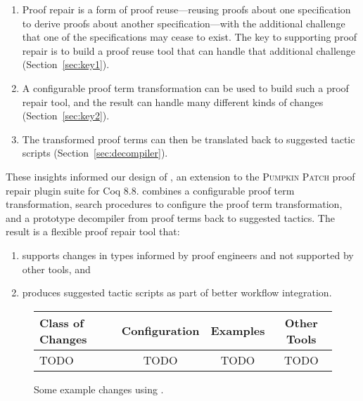 \begin{enumerate}
\item Proof repair is a form of proof reuse---reusing proofs about one specification to derive proofs about another specification---with 
the additional challenge that one of the specifications may cease to exist.
The key to supporting proof repair is to build a proof reuse
tool that can handle that additional challenge (Section~\ref{sec:key1}). 
\item A configurable proof term transformation can be used to build such a proof repair tool,
and the result can handle many different kinds of changes (Section~\ref{sec:key2}).
\item The transformed proof terms can then be translated back to suggested tactic scripts (Section~\ref{sec:decompiler}).
\end{enumerate}

These insights informed our design of \toolname, an extension to the \textsc{Pumpkin Patch} proof repair plugin suite for Coq 8.8.
\toolname combines a configurable proof term transformation,
search procedures to configure the proof term transformation,
and a prototype decompiler from proof terms back to suggested tactics.
The result is a flexible proof repair tool that: 

\begin{enumerate}
\item supports changes in types informed by proof engineers and not supported by other tools, and
\item produces suggested tactic scripts as part of better workflow integration.
\end{enumerate}

\begin{figure}
\small
  \begin{tabular}{|l|c|c|c|}
    \hline
    \textbf{Class of Changes} & \textbf{Configuration} & \textbf{Examples} & \textbf{Other Tools} \\
    \hline
    TODO & TODO & TODO & TODO\\
    \hline
  \end{tabular}
  \caption{Some example changes using \toolname.}
\label{fig:changes}
\end{figure}

